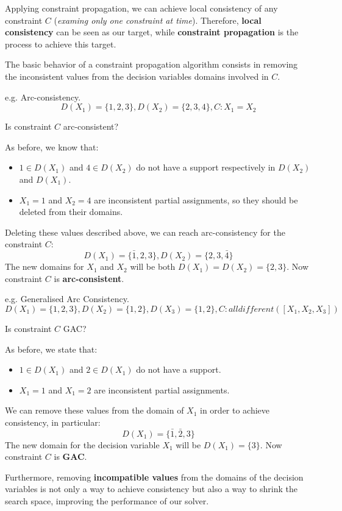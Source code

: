 Applying constraint propagation, we can achieve local consistency of any constraint $C$ (\textit{examing only one constraint at time}). Therefore, \textbf{local consistency}
can be seen as our target, while \textbf{constraint propagation} is the process to achieve this target. \vspace{7pt}

The basic behavior of a constraint propagation algorithm consists in removing the inconsistent values from the decision variables domains involved in $C$.
\begin{example}
    e.g. Arc-consistency. 
    $$ D(X_1) = \{1, 2, 3\}, D(X_2) = \{2, 3, 4\}, C: X_1 = X_2 $$

    Is constraint $C$ arc-consistent? \vspace{7pt}

    As before, we know that: 
    \begin{itemize}
        \renewcommand{\labelitemi}{-}
        \item $1 \in D(X_1)$ and $4 \in D(X_2)$ do not have a support respectively in $D(X_2)$ and $D(X_1)$.
        \item $X_1 = 1$ and $X_2 = 4$ are inconsistent partial assignments, so they should be deleted from their domains. \vspace{7pt}
    \end{itemize}
    Deleting these values described above, we can reach arc-consistency for the constraint $C$:
    $$ D(X_1) = \{\bar{1}, 2, 3\}, D(X_2) = \{2, 3, \bar{4}\} $$
    The new domains for $X_1$ and $X_2$ will be both $D(X_1) = D(X_2) = \{2, 3\}$. Now constraint $C$ is \textbf{arc-consistent}.
\end{example}
\begin{example}
    e.g. Generalised Arc Consistency. 
    $$ D(X_1) = \{1, 2, 3\}, D(X_2) = \{1, 2\}, D(X_3) = \{1, 2\}, C:\textit{alldifferent}([X_1, X_2, X_3]) $$

    Is constraint $C$ GAC? \vspace{7pt}

    As before, we state that:
    \begin{itemize}
        \renewcommand{\labelitemi}{-}
        \item $1 \in D(X_1)$ and $2 \in D(X_1)$ do not have a support.
        \item $X_1 = 1$ and $X_1 = 2$ are inconsistent partial assignments.
    \end{itemize} \vspace{7pt}
    We can remove these values from the domain of $X_1$ in order to achieve consistency, in particular:
    $$ D(X_1) = \{\bar{1}, \bar{2}, 3\} $$
    The new domain for the decision variable $X_1$ will be $D(X_1) = \{3\}$. Now constraint $C$ is \textbf{GAC}.
\end{example}
Furthermore, removing \textbf{incompatible values} from the domains of the decision variables is not only a way to achieve consistency but also a way to shrink
the search space, improving the performance of our solver. \vspace{7pt}

